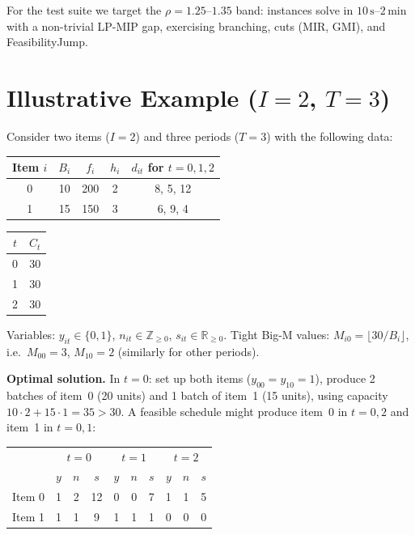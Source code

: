 \documentclass[11pt,a4paper]{article}
\begin{document}
\noindent
For the test suite we target the $\rho=1.25$--$1.35$ band: instances
solve in $10\,\text{s}$--$2\,\text{min}$ with a non-trivial LP-MIP gap,
exercising branching, cuts (MIR, GMI), and FeasibilityJump.

\section{Illustrative Example ($I=2$, $T=3$)}

Consider two items ($I=2$) and three periods ($T=3$) with the following data:

\begin{center}
\begin{tabular}{@{}ccccc@{}}
\toprule
Item $i$ & $B_i$ & $f_i$ & $h_i$ & $d_{it}$ for $t=0,1,2$ \\
\midrule
0 & 10 & 200 & 2 & 8, 5, 12 \\
1 & 15 & 150 & 3 & 6, 9,  4 \\
\bottomrule
\end{tabular}
\qquad
\begin{tabular}{@{}cc@{}}
\toprule
$t$ & $C_t$ \\
\midrule
0 & 30 \\
1 & 30 \\
2 & 30 \\
\bottomrule
\end{tabular}
\end{center}

Variables: $y_{it}\in\{0,1\}$, $n_{it}\in\mathbb{Z}_{\ge 0}$,
$s_{it}\in\mathbb{R}_{\ge 0}$.  Tight Big-M values:
$M_{i0}=\lfloor 30/B_i\rfloor$, i.e.\
$M_{00}=3$, $M_{10}=2$ (similarly for other periods).

\smallskip
\textbf{Optimal solution.}  In $t=0$: set up both items
($y_{00}=y_{10}=1$), produce 2 batches of item~0 (20 units) and 1 batch of
item~1 (15 units), using capacity $10{\cdot}2+15{\cdot}1=35>30$.
A feasible schedule might produce item~0 in $t=0,2$ and item~1 in $t=0,1$:

\begin{center}
\begin{tabular}{@{}c|ccc|ccc|ccc@{}}
\toprule
 & \multicolumn{3}{c|}{$t=0$} & \multicolumn{3}{c|}{$t=1$} & \multicolumn{3}{c}{$t=2$}\\
 & $y$ & $n$ & $s$ & $y$ & $n$ & $s$ & $y$ & $n$ & $s$\\
\midrule
Item 0 & 1 & 2 & 12 & 0 & 0 & 7 & 1 & 1 & 5\\
Item 1 & 1 & 1 & 9  & 1 & 1 & 1 & 0 & 0 & 0\\%
\bottomrule
\end{tabular}
\end{center}
\end{document}
